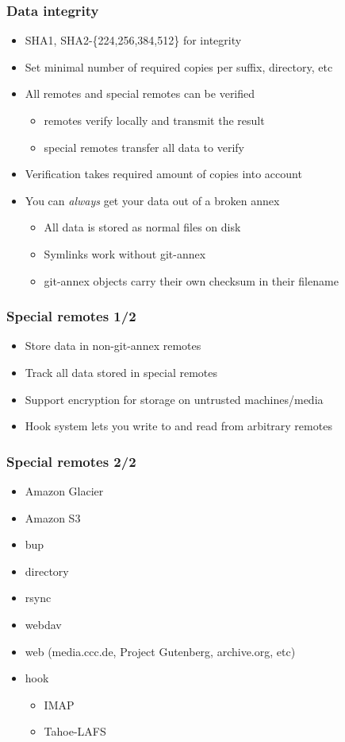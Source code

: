\documentclass[t]{beamer}
\begin{document}
\begin{frame}
	\frametitle{Data integrity}
	\begin{itemize}
		\item SHA1, SHA2-\{224,256,384,512\} for integrity
		\item Set minimal number of required copies per suffix, directory, etc
		\item All remotes and special remotes can be verified
		\begin{itemize}
			\item remotes verify locally and transmit the result
			\item special remotes transfer all data to verify
		\end{itemize}
		\item Verification takes required amount of copies into account
		\item You can \textit{always} get your data out of a broken annex
		\begin{itemize}
			\item All data is stored as normal files on disk
			\item Symlinks work without git-annex
			\item git-annex objects carry their own checksum in their filename
		\end{itemize}
	\end{itemize}
\end{frame}

\begin{frame}
	\frametitle{Special remotes 1/2}
	\begin{itemize}
		\item Store data in non-git-annex remotes
		\item Track all data stored in special remotes
		\item Support encryption for storage on untrusted machines/media
		\item Hook system lets you write to and read from arbitrary remotes
	\end{itemize}
\end{frame}

\begin{frame}
	\frametitle{Special remotes 2/2}
	\begin{itemize}
		\item Amazon Glacier
		\item Amazon S3
		\item bup
		\item directory
		\item rsync
		\item webdav
		\item web (media.ccc.de, Project Gutenberg, archive.org, etc)
		\item hook
		\begin{itemize}
			\item IMAP
			\item Tahoe-LAFS
		\end{itemize}
	\end{itemize}
\end{frame}
\end{document}
